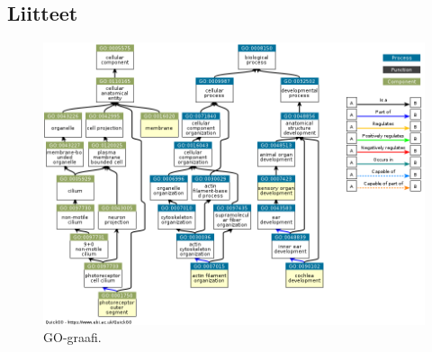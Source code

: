 \documentclass[a4paper,11pt,notitlepage]{article}
\begin{document}
\renewcommand{\thefigure}{A\arabic{figure}}
\setcounter{figure}{0}
\begin{appendices}
\renewcommand\thefigure{\thesection.\arabic{figure}} 
\section{Liitteet}

\begin{figure}[!h]
	\centering
	\includegraphics[width=\textwidth]{gochart.png}
	\caption{GO-graafi.} \label{gograafi}
\end{figure}


\end{appendices}
\end{document}
